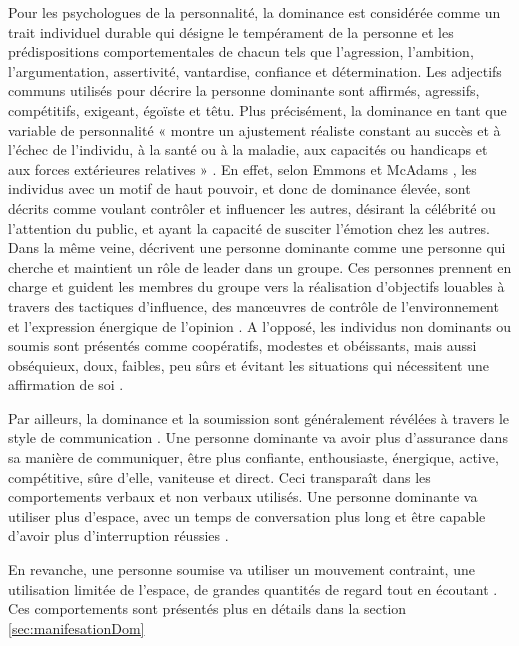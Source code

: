 Pour les psychologues de la personnalité, la dominance est considérée comme un trait individuel durable qui désigne le tempérament de la personne et les prédispositions comportementales de chacun \cite{cattell1970handbook,ridgeway1987nonverbal} tels que l'agression, l'ambition, l'argumentation,
assertivité, vantardise, confiance et détermination.
Les adjectifs communs utilisés pour décrire la personne dominante sont affirmés, agressifs, compétitifs, exigeant, égoïste et têtu. Plus précisément, la dominance en tant que variable de personnalité « montre un ajustement réaliste constant au succès et à l'échec de l'individu, à la santé ou à la maladie, aux capacités ou handicaps et aux forces extérieures relatives » \cite{cattell1970handbook,burgoon1998nature}.
En effet, selon  Emmons et McAdams \cite{emmons1991personal}, les individus avec un motif de haut pouvoir, et donc de dominance élevée, sont décrits comme voulant contrôler et influencer les autres, désirant la célébrité ou l'attention du public, et ayant la capacité de susciter l'émotion chez les autres. Dans la même veine, \cite{jackson1974personality} décrivent une personne dominante comme une personne qui cherche et maintient un rôle de leader dans un groupe. Ces personnes prennent en charge et guident les membres du groupe vers la réalisation d'objectifs louables à travers des tactiques d'influence, des manœuvres de contrôle de l'environnement et l'expression énergique de l'opinion \cite{burgoon1998nature}. 
A l'opposé, les individus non dominants ou soumis sont présentés comme coopératifs, modestes et obéissants, mais aussi obséquieux, doux, faibles, peu sûrs et évitant les situations qui nécessitent une affirmation de soi \cite{burgoon1998nature}. 

Par ailleurs, la dominance et la soumission sont généralement révélées à travers le style de communication \cite{burgoon1998nature}. Une personne dominante va avoir plus d'assurance dans sa manière de communiquer, être plus confiante, enthousiaste, énergique, active, compétitive, sûre d'elle, vaniteuse et direct. Ceci transparaît dans les comportements verbaux et non verbaux utilisés. Une personne dominante va  utiliser plus d'espace, avec un temps de conversation plus long et être capable d'avoir plus d'interruption réussies \cite{burgoon1998nature}. 

En revanche, une personne soumise va utiliser un mouvement contraint, une utilisation limitée de l'espace, de grandes quantités de regard tout en écoutant  \cite{burgoon1998nature}. Ces comportements sont présentés plus en détails dans la section  \ref{sec:manifesationDom}


